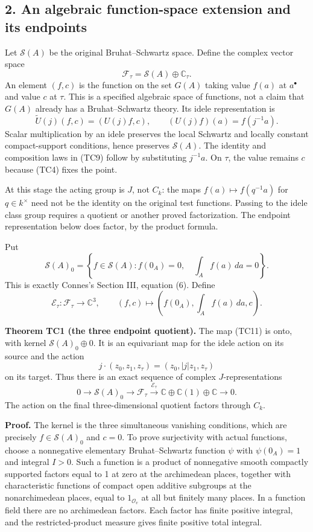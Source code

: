 \documentclass[
  10pt,
]{article}
\begin{document}
\subsection{2. An algebraic function-space extension and its
endpoints}\label{an-algebraic-function-space-extension-and-its-endpoints}

Let \(\mathcal S(A)\) be the original Bruhat--Schwartz space. Define the
complex vector space \[
\mathcal F_\tau=\mathcal S(A)\oplus\mathbb C_\tau.
\tag{TC8}
\] An element \((f,c)\) is the function on the set \(G(A)\) taking value
\(f(a)\) at \(a^\bullet\) and value \(c\) at \(\tau\). This is a
specified algebraic space of functions, not a claim that \(G(A)\)
already has a Bruhat--Schwartz theory. Its idele representation is \[
\widetilde U(j)(f,c)=(U(j)f,c),\qquad
(U(j)f)(a)=f(j^{-1}a).
\tag{TC9}
\] Scalar multiplication by an idele preserves the local Schwartz and
locally constant compact-support conditions, hence preserves
\(\mathcal S(A)\). The identity and composition laws in (TC9) follow by
substituting \(j^{-1}a\). On \(\tau\), the value remains \(c\) because
(TC4) fixes the point.

At this stage the acting group is \(J\), not \(C_k\): the maps
\(f(a)\mapsto f(q^{-1}a)\) for \(q\in k^\times\) need not be the
identity on the original test functions. Passing to the idele class
group requires a quotient or another proved factorization. The endpoint
representation below does factor, by the product formula.

Put \[
\mathcal S(A)_0=\left\{f\in\mathcal S(A):f(0_A)=0,
\quad\int_A f(a)\,da=0\right\}.
\tag{TC10}
\] This is exactly Connes's Section III, equation (6). Define \[
\mathcal E_\tau:\mathcal F_\tau\longrightarrow\mathbb C^3,
\qquad (f,c)\longmapsto
\left(f(0_A),\int_A f(a)\,da,c\right).
\tag{TC11}
\]

\textbf{Theorem TC1 (the three endpoint quotient).} The map (TC11) is
onto, with kernel \(\mathcal S(A)_0\oplus0\). It is an equivariant map
for the idele action on its source and the action \[
j\cdot(z_0,z_1,z_\tau)=(z_0,|j|z_1,z_\tau)
\tag{TC12}
\] on its target. Thus there is an exact sequence of complex
\(J\)-representations \[
0\longrightarrow\mathcal S(A)_0\longrightarrow\mathcal F_\tau
\xrightarrow{\mathcal E_\tau}
\mathbb C\oplus\mathbb C(1)\oplus\mathbb C\longrightarrow0.
\tag{TC13}
\] The action on the final three-dimensional quotient factors through
\(C_k\).

\textbf{Proof.} The kernel is the three simultaneous vanishing
conditions, which are precisely \(f\in\mathcal S(A)_0\) and \(c=0\). To
prove surjectivity with actual functions, choose a nonnegative
elementary Bruhat--Schwartz function \(\psi\) with \(\psi(0_A)=1\) and
integral \(I>0\). Such a function is a product of nonnegative smooth
compactly supported factors equal to 1 at zero at the archimedean
places, together with characteristic functions of compact open additive
subgroups at the nonarchimedean places, equal to \(1_{\mathcal O_v}\) at
all but finitely many places. In a function field there are no
archimedean factors. Each factor has finite positive integral, and the
restricted-product measure gives finite positive total integral.
\end{document}

